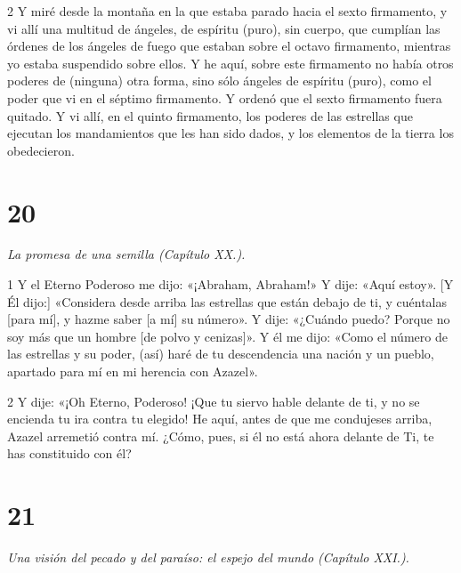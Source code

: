 \par 2 Y miré desde la montaña en la que estaba parado hacia el sexto firmamento, y vi allí una multitud de ángeles, de espíritu (puro), sin cuerpo, que cumplían las órdenes de los ángeles de fuego que estaban sobre el octavo firmamento, mientras yo estaba suspendido sobre ellos. Y he aquí, sobre este firmamento no había otros poderes de (ninguna) otra forma, sino sólo ángeles de espíritu (puro), como el poder que vi en el séptimo firmamento. Y ordenó que el sexto firmamento fuera quitado. Y vi allí, en el quinto firmamento, los poderes de las estrellas que ejecutan los mandamientos que les han sido dados, y los elementos de la tierra los obedecieron.

\chapter{20}

\par \textit{La promesa de una semilla (Capítulo XX.).}

\par 1 Y el Eterno Poderoso me dijo: «¡Abraham, Abraham!» Y dije: «Aquí estoy». [Y Él dijo:] «Considera desde arriba las estrellas que están debajo de ti, y cuéntalas [para mí], y hazme saber [a mí] su número». Y dije: «¿Cuándo puedo? Porque no soy más que un hombre [de polvo y cenizas]». Y él me dijo: «Como el número de las estrellas y su poder, (así) haré de tu descendencia una nación y un pueblo, apartado para mí en mi herencia con Azazel».

\par 2 Y dije: «¡Oh Eterno, Poderoso! ¡Que tu siervo hable delante de ti, y no se encienda tu ira contra tu elegido! He aquí, antes de que me condujeses arriba, Azazel arremetió contra mí. ¿Cómo, pues, si él no está ahora delante de Ti, te has constituido con él?

\chapter{21}

\par \textit{Una visión del pecado y del paraíso: el espejo del mundo (Capítulo XXI.).}


